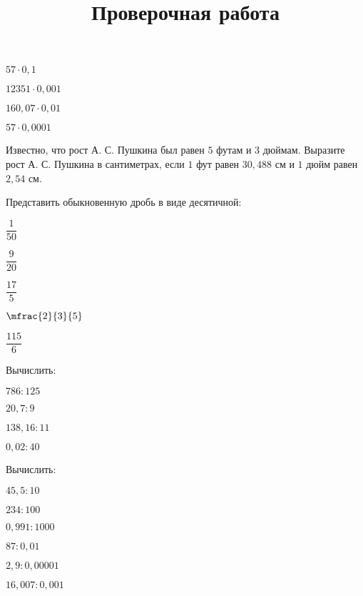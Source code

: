 \begin{class}[number=7]
\begin{listofex}
\begin{enumcols}[itemcolumns=4]
			\item \( 57\cdot0,1 \)
			\item \( 12351\cdot0,001 \)
			\item \( 160,07\cdot0,01 \)
			\item \( 57\cdot0,0001 \)
		\end{enumcols}
		\item Известно, что рост А. С. Пушкина был равен \( 5 \) футам и \( 3 \) дюймам. Выразите рост А. С.
		Пушкина в сантиметрах, если \( 1 \) фут равен \( 30,488 \) см и \( 1 \) дюйм равен \( 2,54 \) см.
		\item Представить обыкновенную дробь в виде десятичной:
		\begin{enumcols}[itemcolumns=5]
			\item \( \dfrac{1}{50} \)
			\item \( \dfrac{9}{20} \)
			\item \( \dfrac{17}{5} \)
			\item \( \mfrac{2}{3}{5} \)
			\item \( \dfrac{115}{6} \)
		\end{enumcols}
		\item Вычислить:
		\begin{enumcols}[itemcolumns=4]
			\item \( 786:125 \)
			\item \( 20,7:9 \)
			\item \( 138,16:11 \)
			\item \( 0,02:40 \)
		\end{enumcols}
		\item Вычислить:
		\begin{enumcols}[itemcolumns=3]
			\item \( 45,5:10 \)
			\item \( 234:100 \)
			\item \( 0,991:1000 \)
			\item \( 87:0,01 \)
			\item \( 2,9:0,00001 \)
			\item \( 16,007:0,001 \)
		\end{enumcols}
	\end{listofex}
\end{class}
\newpage
\title{Проверочная работа}
